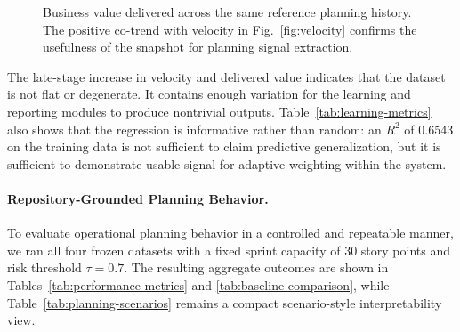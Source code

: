 \documentclass[conference]{IEEEtran}
\begin{document}
\begin{figure}[t]
\centering
{}
\caption{Business value delivered across the same reference planning history.
         The positive co-trend with velocity in Fig.~\ref{fig:velocity} confirms
         the usefulness of the snapshot for planning signal extraction.}
\label{fig:value-trend}
\end{figure}

The late-stage increase in velocity and delivered value indicates that the dataset
is not flat or degenerate.
It contains enough variation for the learning and reporting modules to produce
nontrivial outputs.
Table~\ref{tab:learning-metrics} also shows that the regression is informative
rather than random: an $R^{2}$ of 0.6543 on the training data is not sufficient to
claim predictive generalization, but it is sufficient to demonstrate usable signal
for adaptive weighting within the system.

\paragraph{Repository-Grounded Planning Behavior.}

To evaluate operational planning behavior in a controlled and repeatable manner,
we ran all four frozen datasets with a fixed sprint capacity of 30 story points
and risk threshold $\tau=0.7$.
The resulting aggregate outcomes are shown in
Tables~\ref{tab:performance-metrics} and \ref{tab:baseline-comparison}, while
Table~\ref{tab:planning-scenarios} remains a compact scenario-style
interpretability view.
\end{document}
